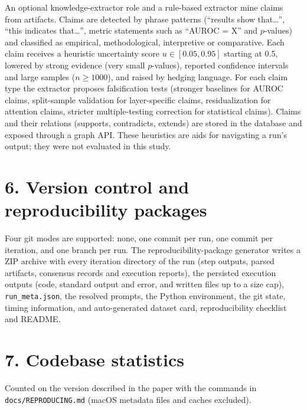 \documentclass[10pt,letterpaper]{article}
\begin{document}
An optional knowledge-extractor role and a rule-based extractor mine claims from artifacts. Claims are detected by phrase patterns (``results show that\ldots'', ``this indicates that\ldots'', metric statements such as ``AUROC = X'' and $p$-values) and classified as empirical, methodological, interpretive or comparative. Each claim receives a heuristic uncertainty score $u\in[0.05,0.95]$ starting at 0.5, lowered by strong evidence (very small $p$-values), reported confidence intervals and large samples ($n\geq1000$), and raised by hedging language. For each claim type the extractor proposes falsification tests (stronger baselines for AUROC claims, split-sample validation for layer-specific claims, residualization for attention claims, stricter multiple-testing correction for statistical claims). Claims and their relations (supports, contradicts, extends) are stored in the database and exposed through a graph API. These heuristics are aids for navigating a run's output; they were not evaluated in this study.

\section*{6. Version control and reproducibility packages}

Four git modes are supported: none, one commit per run, one commit per iteration, and one branch per run. The reproducibility-package generator writes a ZIP archive with every iteration directory of the run (step outputs, parsed artifacts, consensus records and execution reports), the persisted execution outputs (code, standard output and error, and written files up to a size cap), \texttt{run\_meta.json}, the resolved prompts, the Python environment, the git state, timing information, and auto-generated dataset card, reproducibility checklist and README.

\section*{7. Codebase statistics}

Counted on the version described in the paper with the commands in \texttt{docs/REPRODUCING.md} (macOS metadata files and caches excluded).
\end{document}

